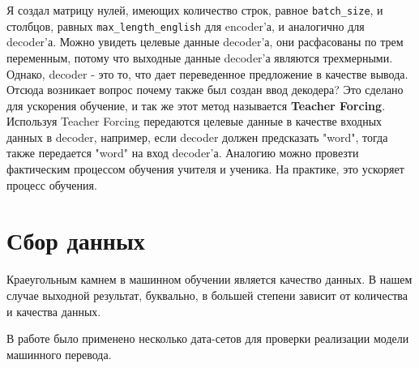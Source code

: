 	Я создал матрицу нулей, имеющих количество строк, равное \texttt{batch_size}, и столбцов, равных \texttt{max_length_english} для encoder'а, и аналогично для decoder'а. Можно увидеть целевые данные decoder'а, они расфасованы по трем переменным, потому что выходные данные decoder'а являются трехмерными. Однако, decoder - это то, что дает переведенное предложение в качестве вывода. Отсюда возникает вопрос почему также был создан ввод декодера? Это сделано для ускорения обучение, и так же этот метод называется \textbf{Teacher Forcing}. Используя Teacher Forcing передаются целевые данные в качестве входных данных в decoder, например, если decoder должен предсказать "word", тогда также передается "word" на вход decoder'а. Аналогию можно провезти  фактическим процессом обучения учителя и ученика. На практике, это ускоряет процесс обучения.
	
	\clearpage
	
	\section{Сбор данных}
	
	Краеугольным камнем в машинном обучении является качество данных. В нашем случае выходной результат, буквально, в большей степени зависит от количества и качества данных.
	
	В работе было применено несколько дата-сетов для проверки реализации модели машинного перевода.
	
